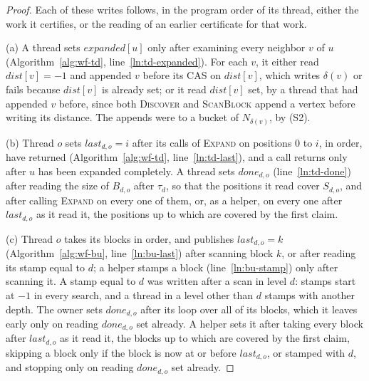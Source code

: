\begin{proof}
Each of these writes follows, in the program order of its thread, either the work it certifies, or the reading of an earlier certificate for that work.

(a) A thread sets $\mathit{expanded}[u]$ only after examining every neighbor $v$ of $u$ (Algorithm~\ref{alg:wf-td}, line~\ref{ln:td-expanded}). For each $v$, it either read $\mathit{dist}[v] = -1$ and appended $v$ before its CAS on $\mathit{dist}[v]$, which writes $\delta(v)$ or fails because $\mathit{dist}[v]$ is already set; or it read $\mathit{dist}[v]$ set, by a thread that had appended $v$ before, since both \textsc{Discover} and \textsc{ScanBlock} append a vertex before writing its distance. The appends were to a bucket of $N_{\delta(v)}$, by (S2).

(b) Thread $o$ sets $\mathit{last}_{d,o} = i$ after its calls of \textsc{Expand} on positions $0$ to $i$, in order, have returned (Algorithm~\ref{alg:wf-td}, line~\ref{ln:td-last}), and a call returns only after $u$ has been expanded completely. A thread sets $\mathit{done}_{d,o}$ (line~\ref{ln:td-done}) after reading the size of $B_{d,o}$ after $\tau_d$, so that the positions it read cover $S_{d,o}$, and after calling \textsc{Expand} on every one of them, or, as a helper, on every one after $\mathit{last}_{d,o}$ as it read it, the positions up to which are covered by the first claim.

(c) Thread $o$ takes its blocks in order, and publishes $\mathit{last}_{d,o} = k$ (Algorithm~\ref{alg:wf-bu}, line~\ref{ln:bu-last}) after scanning block $k$, or after reading its stamp equal to $d$; a helper stamps a block (line~\ref{ln:bu-stamp}) only after scanning it. A stamp equal to $d$ was written after a scan in level $d$: stamps start at $-1$ in every search, and a thread in a level other than $d$ stamps with another depth. The owner sets $\mathit{done}_{d,o}$ after its loop over all of its blocks, which it leaves early only on reading $\mathit{done}_{d,o}$ set already. A helper sets it after taking every block after $\mathit{last}_{d,o}$ as it read it, the blocks up to which are covered by the first claim, skipping a block only if the block is now at or before $\mathit{last}_{d,o}$, or stamped with $d$, and stopping only on reading $\mathit{done}_{d,o}$ set already.
\end{proof}

